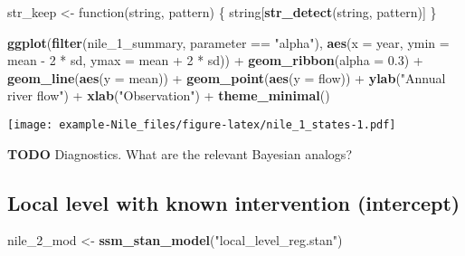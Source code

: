 \documentclass[]{book}
\newenvironment{Shaded}{\begin{snugshade}}{\end{snugshade}}
\newcommand{\KeywordTok}[1]{\textcolor[rgb]{0.13,0.29,0.53}{\textbf{{#1}}}}
\newcommand{\DataTypeTok}[1]{\textcolor[rgb]{0.13,0.29,0.53}{{#1}}}
\newcommand{\DecValTok}[1]{\textcolor[rgb]{0.00,0.00,0.81}{{#1}}}
\newcommand{\FloatTok}[1]{\textcolor[rgb]{0.00,0.00,0.81}{{#1}}}
\newcommand{\StringTok}[1]{\textcolor[rgb]{0.31,0.60,0.02}{{#1}}}
\newcommand{\NormalTok}[1]{{#1}}
\begin{document}
\begin{Shaded}
\begin{Highlighting}[]
\NormalTok{str_keep <-}\StringTok{ }\NormalTok{function(string, pattern) \{}
  \NormalTok{string[}\KeywordTok{str_detect}\NormalTok{(string, pattern)]}
\NormalTok{\}}

\KeywordTok{ggplot}\NormalTok{(}\KeywordTok{filter}\NormalTok{(nile_1_summary, parameter ==}\StringTok{ "alpha"}\NormalTok{),}
       \KeywordTok{aes}\NormalTok{(}\DataTypeTok{x =} \NormalTok{year,}
           \DataTypeTok{ymin =} \NormalTok{mean -}\StringTok{ }\DecValTok{2} \NormalTok{*}\StringTok{ }\NormalTok{sd,}
           \DataTypeTok{ymax =} \NormalTok{mean +}\StringTok{ }\DecValTok{2} \NormalTok{*}\StringTok{ }\NormalTok{sd)) +}
\StringTok{  }\KeywordTok{geom_ribbon}\NormalTok{(}\DataTypeTok{alpha =} \FloatTok{0.3}\NormalTok{) +}
\StringTok{  }\KeywordTok{geom_line}\NormalTok{(}\KeywordTok{aes}\NormalTok{(}\DataTypeTok{y =} \NormalTok{mean)) +}
\StringTok{  }\KeywordTok{geom_point}\NormalTok{(}\KeywordTok{aes}\NormalTok{(}\DataTypeTok{y =} \NormalTok{flow)) +}
\StringTok{  }\KeywordTok{ylab}\NormalTok{(}\StringTok{"Annual river flow"}\NormalTok{) +}
\StringTok{  }\KeywordTok{xlab}\NormalTok{(}\StringTok{"Observation"}\NormalTok{) +}
\StringTok{  }\KeywordTok{theme_minimal}\NormalTok{()}
\end{Highlighting}
\end{Shaded}

\texttt{[image: example-Nile\_files/figure-latex/nile\_1\_states-1.pdf]}

\textbf{TODO} Diagnostics. What are the relevant Bayesian analogs?

\subsection{Local level with known intervention
(intercept)}\label{local-level-with-known-intervention-intercept}

\begin{Shaded}
\begin{Highlighting}[]
\NormalTok{nile_2_mod <-}\StringTok{ }\KeywordTok{ssm_stan_model}\NormalTok{(}\StringTok{"local_level_reg.stan"}\NormalTok{)}
\end{Highlighting}
\end{Shaded}
\end{document}
